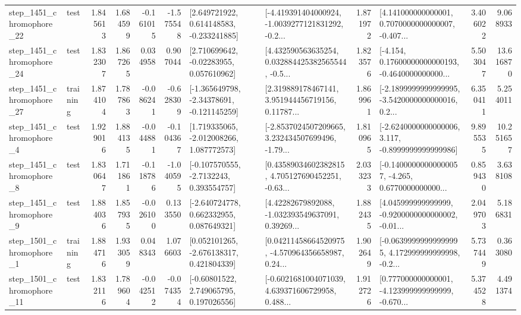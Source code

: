\begin{tabular}{llrrrrllrlrr}
 step\_1451\_chromophore\_22 &      test &      1.845613 &    1.684599 &     -0.161015 & -1.575548 &    [2.649721922, 0.614148583, -0.233241885] &  [-4.419391404000924, -1.0039277121831292, -0.2... &       1.871972 &  [4.141000000000001, 0.7070000000000007, -0.407... &            3.406022 &          9.068933 \\
 step\_1451\_chromophore\_24 &      test &      1.832307 &    1.867265 &      0.034958 &  0.907044 &     [2.710699642, -0.02283955, 0.057610962] &  [4.432590563635254, 0.032884425382565544, -0.5... &       1.823576 &  [-4.154, 0.17600000000000193, -0.4640000000000... &            5.503047 &         13.616870 \\
 step\_1451\_chromophore\_27 &  training &      1.874104 &    1.787863 &     -0.086241 & -0.628309 &   [-1.365649798, -2.34378691, -0.121145259] &  [2.319889178467141, 3.951944456719156, 0.11787... &       1.869961 &  [-2.1899999999999995, -3.5420000000000016, 0.2... &            6.350411 &          5.254011 \\
  step\_1451\_chromophore\_4 &      test &      1.929016 &    1.884135 &     -0.044881 & -0.104367 &    [1.719335065, -2.012008266, 1.087772573] &  [-2.8537024507209665, 3.232434507699496, -1.79... &       1.810965 &  [-2.6240000000000006, 3.117, -0.8999999999999986] &            9.895535 &         10.251657 \\
  step\_1451\_chromophore\_8 &      test &      1.830647 &    1.711861 &     -0.118786 & -1.040595 &     [-0.107570555, -2.7132243, 0.393554757] &  [0.43589034602382815, 4.705127690452251, -0.63... &       2.033233 &  [-0.14000000000000057, -4.265, 0.6770000000000... &            0.859430 &          3.638108 \\
  step\_1451\_chromophore\_9 &      test &      1.884036 &    1.857935 &     -0.026100 &  0.133550 &    [-2.640724778, 0.662332955, 0.087649321] &  [4.42282679892088, -1.032393549637091, 0.39269... &       1.882435 &  [4.045999999999999, -0.9200000000000002, -0.01... &            2.049703 &          5.186831 \\
  step\_1501\_chromophore\_1 &  training &      1.884716 &    1.933059 &      0.048343 &  1.076603 &    [0.052101265, -2.676138317, 0.421804339] &  [0.04211458664520975, -4.570964356658987, 0.24... &       1.902649 &  [-0.06399999999999995, 4.172999999999998, -0.2... &            5.737449 &          0.363080 \\
 step\_1501\_chromophore\_11 &      test &      1.832116 &    1.789604 &     -0.042512 & -0.074354 &     [-0.60801522, 2.749065795, 0.197026556] &  [-0.6021681004071039, 4.639371606729958, 0.488... &       1.912726 &  [0.777000000000001, -4.123999999999999, -0.670... &            5.374528 &          4.491374 \\

\end{tabular}
